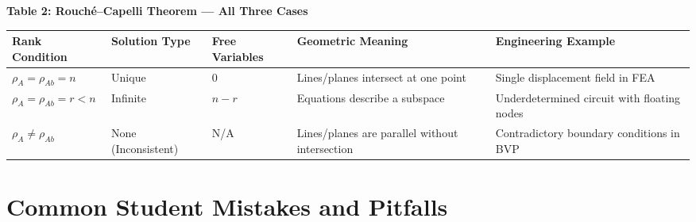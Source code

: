 \documentclass[12pt,a4paper]{article}
\begin{document}
\vspace{1em}

\begin{center}
\textbf{Table 2: Rouch\'{e}--Capelli Theorem --- All Three Cases}
\vspace{0.4em}

\begin{tabular}{@{}p{3cm}p{2.5cm}p{2.5cm}p{2.8cm}p{3cm}@{}}
\toprule
\textbf{Rank Condition} & \textbf{Solution Type} & \textbf{Free Variables} & \textbf{Geometric Meaning} & \textbf{Engineering Example} \\
\midrule
$\rho_A = \rho_{Ab} = n$ & Unique & 0 & Lines/planes intersect at one point & Single displacement field in FEA \\
\addlinespace
$\rho_A = \rho_{Ab} = r < n$ & Infinite & $n - r$ & Equations describe a subspace & Underdetermined circuit with floating nodes \\
\addlinespace
$\rho_A \neq \rho_{Ab}$ & None (Inconsistent) & N/A & Lines/planes are parallel without intersection & Contradictory boundary conditions in BVP \\
\bottomrule
\end{tabular}
\end{center}

\section{Common Student Mistakes and Pitfalls}
\end{document}
